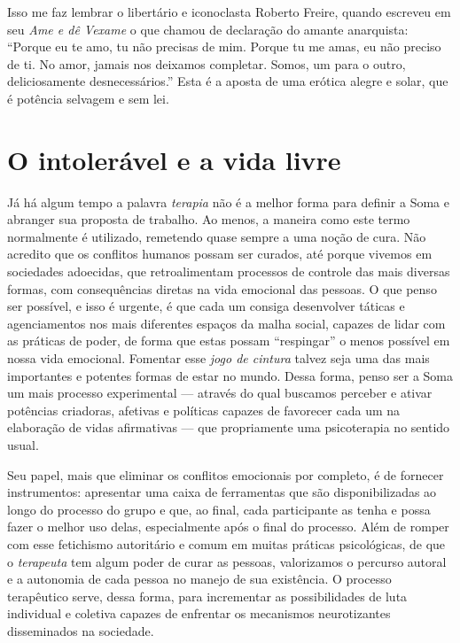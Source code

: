 Isso me faz lembrar o libertário e iconoclasta Roberto Freire, quando
escreveu em seu \emph{Ame e dê Vexame} o que chamou de declaração do amante
anarquista: ``Porque eu te amo, tu não precisas de mim. Porque tu me
amas, eu não preciso de ti. No amor, jamais nos deixamos completar.
Somos, um para o outro, deliciosamente desnecessários.'' Esta é a aposta
de uma erótica alegre e solar, que é potência selvagem e sem lei.

\section{O intolerável e a vida livre}

Já há algum tempo a palavra \emph{terapia} não é a melhor forma para
definir a Soma e abranger sua proposta de trabalho. Ao menos, a maneira
como este termo normalmente é utilizado, remetendo quase sempre a uma
noção de cura. Não acredito que os conflitos humanos possam ser curados,
até porque vivemos em sociedades adoecidas, que retroalimentam processos
de controle das mais diversas formas, com consequências diretas na vida
emocional das pessoas. O que penso ser possível, e isso é urgente, é que
cada um consiga desenvolver táticas e agenciamentos nos mais diferentes
espaços da malha social, capazes de lidar com as práticas de poder, de
forma que estas possam ``respingar'' o menos possível em nossa vida
emocional. Fomentar esse \emph{jogo de cintura} talvez seja uma das mais
importantes e potentes formas de estar no mundo.
Dessa forma, penso ser a Soma um mais processo experimental --- através do
qual buscamos perceber e ativar potências criadoras, afetivas e
políticas capazes de favorecer cada um na elaboração de vidas
afirmativas --- que propriamente uma psicoterapia no sentido usual.

Seu papel, mais que eliminar os conflitos emocionais por completo, é de
fornecer instrumentos: apresentar uma caixa de ferramentas que são
disponibilizadas ao longo do processo do grupo e que, ao final, cada
participante as tenha e possa fazer o melhor uso delas, especialmente
após o final do processo. Além de romper com esse fetichismo autoritário
e comum em muitas práticas psicológicas, de que o \emph{terapeuta} tem
algum poder de curar as pessoas, valorizamos o percurso autoral e a
autonomia de cada pessoa no manejo de sua existência. O processo
terapêutico serve, dessa forma, para incrementar as possibilidades de
luta individual e coletiva capazes de enfrentar os mecanismos
neurotizantes disseminados na sociedade.

